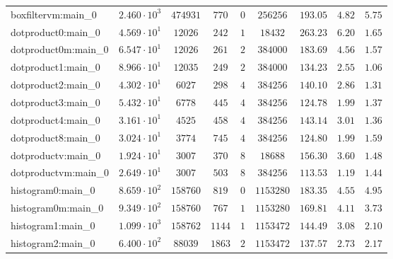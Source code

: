 \begin{tabular}{|l|c|c|c|c|c|c|c|c|}
boxfiltervm:main\_0            & $ 2.460 \cdot 10^{3} $ & $ 474931   $ & $ 770    $ & $ 0    $ & $ 256256   $ & $ 193.05      $ & $ 4.82    $ & $ 5.75    $ \\
dotproduct0:main\_0            & $ 4.569 \cdot 10^{1} $ & $ 12026    $ & $ 242    $ & $ 1    $ & $ 18432    $ & $ 263.23      $ & $ 6.20    $ & $ 1.65    $ \\
dotproduct0m:main\_0           & $ 6.547 \cdot 10^{1} $ & $ 12026    $ & $ 261    $ & $ 2    $ & $ 384000   $ & $ 183.69      $ & $ 4.56    $ & $ 1.57    $ \\
dotproduct1:main\_0            & $ 8.966 \cdot 10^{1} $ & $ 12035    $ & $ 249    $ & $ 2    $ & $ 384000   $ & $ 134.23      $ & $ 2.55    $ & $ 1.06    $ \\
dotproduct2:main\_0            & $ 4.302 \cdot 10^{1} $ & $ 6027     $ & $ 298    $ & $ 4    $ & $ 384256   $ & $ 140.10      $ & $ 2.86    $ & $ 1.31    $ \\
dotproduct3:main\_0            & $ 5.432 \cdot 10^{1} $ & $ 6778     $ & $ 445    $ & $ 4    $ & $ 384256   $ & $ 124.78      $ & $ 1.99    $ & $ 1.37    $ \\
dotproduct4:main\_0            & $ 3.161 \cdot 10^{1} $ & $ 4525     $ & $ 458    $ & $ 4    $ & $ 384256   $ & $ 143.14      $ & $ 3.01    $ & $ 1.36    $ \\
dotproduct8:main\_0            & $ 3.024 \cdot 10^{1} $ & $ 3774     $ & $ 745    $ & $ 4    $ & $ 384256   $ & $ 124.80      $ & $ 1.99    $ & $ 1.59    $ \\
dotproductv:main\_0            & $ 1.924 \cdot 10^{1} $ & $ 3007     $ & $ 370    $ & $ 8    $ & $ 18688    $ & $ 156.30      $ & $ 3.60    $ & $ 1.48    $ \\
dotproductvm:main\_0           & $ 2.649 \cdot 10^{1} $ & $ 3007     $ & $ 503    $ & $ 8    $ & $ 384256   $ & $ 113.53      $ & $ 1.19    $ & $ 1.44    $ \\
histogram0:main\_0             & $ 8.659 \cdot 10^{2} $ & $ 158760   $ & $ 819    $ & $ 0    $ & $ 1153280  $ & $ 183.35      $ & $ 4.55    $ & $ 4.95    $ \\
histogram0m:main\_0            & $ 9.349 \cdot 10^{2} $ & $ 158760   $ & $ 767    $ & $ 1    $ & $ 1153280  $ & $ 169.81      $ & $ 4.11    $ & $ 3.73    $ \\
histogram1:main\_0             & $ 1.099 \cdot 10^{3} $ & $ 158762   $ & $ 1144   $ & $ 1    $ & $ 1153472  $ & $ 144.49      $ & $ 3.08    $ & $ 2.10    $ \\
histogram2:main\_0             & $ 6.400 \cdot 10^{2} $ & $ 88039    $ & $ 1863   $ & $ 2    $ & $ 1153472  $ & $ 137.57      $ & $ 2.73    $ & $ 2.17    $ \\

\end{tabular}
